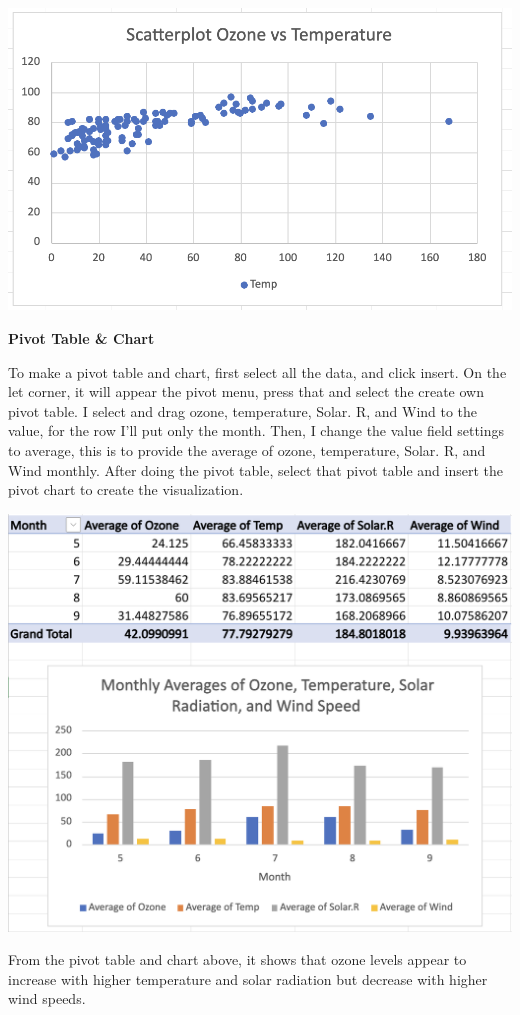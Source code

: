 \documentclass[
  letterpaper,
  DIV=11,
  numbers=noendperiod]{scrreprt}
\begin{document}
\includegraphics{./scatterplotozone.png}

\textbf{Pivot Table \& Chart}

To make a pivot table and chart, first select all the data, and click
insert. On the let corner, it will appear the pivot menu, press that and
select the create own pivot table. I select and drag ozone, temperature,
Solar. R, and Wind to the value, for the row I'll put only the month.
Then, I change the value field settings to average, this is to provide
the average of ozone, temperature, Solar. R, and Wind monthly. After
doing the pivot table, select that pivot table and insert the pivot
chart to create the visualization.

\includegraphics{./pivot1.png}

From the pivot table and chart above, it shows that ozone levels appear
to increase with higher temperature and solar radiation but decrease
with higher wind speeds.
\end{document}
